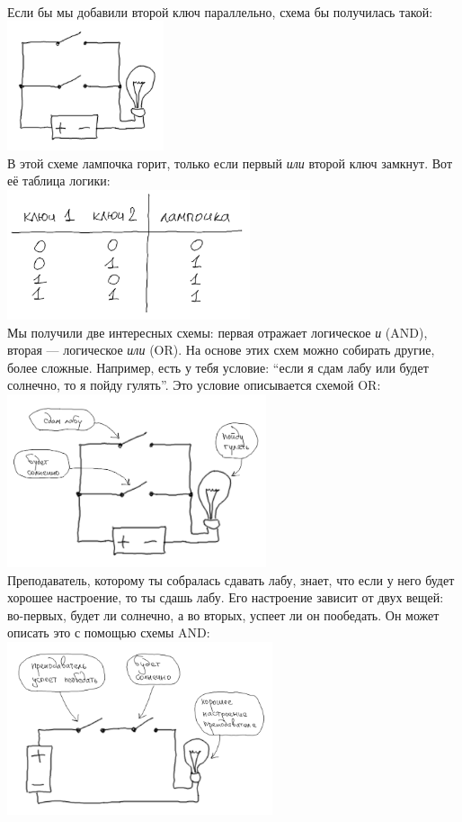 \documentclass[11pt]{book}
\begin{document}
\\
Если бы мы добавили второй ключ параллельно, схема бы получилась такой:
\\
\includegraphics[height=1.5in]{pic/6.png}
\\
В этой схеме лампочка горит, только если первый \emph{или} второй ключ замкнут.
Вот её таблица логики:
\\
\includegraphics[height=1.5in]{pic/7.png}
\\
Мы получили две интересных схемы: первая отражает логическое \emph{и} (AND), вторая ---
логическое \emph{или} (OR). На основе этих схем можно собирать другие, более сложные.
Например, есть у тебя условие: ``если я сдам лабу или будет солнечно,
то я пойду гулять''. Это условие описывается схемой OR:
\\
\includegraphics[height=2in]{pic/8.png}
\\
Преподаватель, которому ты собралась сдавать лабу, знает, что если у него
будет хорошее настроение, то ты сдашь лабу. Его настроение зависит от двух вещей:
во-первых, будет ли солнечно, а во вторых, успеет ли он пообедать.
Он может описать это с помощью схемы AND:
\\
\includegraphics[height=2in]{pic/9.png}
\end{document}
